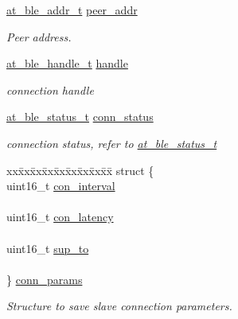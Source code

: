 \begin{DoxyCompactItemize}
\item 
\mbox{\hyperlink{structat__ble__addr__t}{at\+\_\+ble\+\_\+addr\+\_\+t}} \mbox{\hyperlink{structat__ble__connected__t_a262f2982177c35fb3a051c22da655052}{peer\+\_\+addr}}
\begin{DoxyCompactList}\small\item\em Peer address. \end{DoxyCompactList}\item 
\mbox{\hyperlink{at__ble__api_8h_abd23646d0c662860741f787efc8456f2}{at\+\_\+ble\+\_\+handle\+\_\+t}} \mbox{\hyperlink{structat__ble__connected__t_ab8b0f353cb6a8d85f0822900e3b7cf35}{handle}}
\begin{DoxyCompactList}\small\item\em connection handle \end{DoxyCompactList}\item 
\mbox{\hyperlink{group__error__codes__group_ga3b1db9b95feb157b3c188ca27fe76988}{at\+\_\+ble\+\_\+status\+\_\+t}} \mbox{\hyperlink{structat__ble__connected__t_ac84e32b45685da99c4d77127bdaf58c8}{conn\+\_\+status}}
\begin{DoxyCompactList}\small\item\em connection status, refer to \mbox{\hyperlink{at__ble__api_8h_ace24eb4e5ca3f325c663b809da5feb92}{at\+\_\+ble\+\_\+status\+\_\+t}} \end{DoxyCompactList}\item 
\begin{tabbing}
xx\=xx\=xx\=xx\=xx\=xx\=xx\=xx\=xx\=\kill
struct \{\\
\>uint16\_t \mbox{\hyperlink{structat__ble__connected__t_a99a245058c41cb5762cc6b6dead42c10}{con\_interval}}\\
\>\\
\>uint16\_t \mbox{\hyperlink{structat__ble__connected__t_a7a288732b0f90cff943de752cbeb8df4}{con\_latency}}\\
\>\\
\>uint16\_t \mbox{\hyperlink{structat__ble__connected__t_aecd2f769dafdf871d7c6d25c13cd831d}{sup\_to}}\\
\>\\
\} \mbox{\hyperlink{structat__ble__connected__t_a40f48e35c4726408c3146d89949d5823}{conn\_params}}\\

\end{tabbing}\begin{DoxyCompactList}\small\item\em Structure to save slave connection parameters. \end{DoxyCompactList}\end{DoxyCompactItemize}


